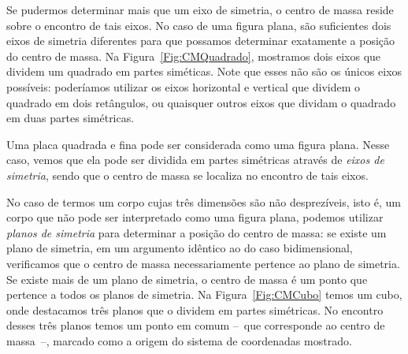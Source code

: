 Se pudermos determinar mais que um eixo de simetria, o centro de massa reside sobre o encontro de tais eixos. No caso de uma figura plana, são suficientes dois eixos de simetria diferentes para que possamos determinar exatamente a posição do centro de massa. Na Figura~\ref{Fig:CMQuadrado}, mostramos dois eixos que dividem um quadrado em partes siméticas. Note que esses não são os únicos eixos possíveis: poderíamos utilizar os eixos horizontal e vertical que dividem o quadrado em dois retângulos, ou quaisquer outros eixos que dividam o quadrado em duas partes simétricas.
\begin{marginfigure}
\centering
{}
\caption{Uma placa quadrada e fina pode ser considerada como uma figura plana. Nesse caso, vemos que ela pode ser dividida em partes simétricas através de \emph{eixos de simetria}, sendo que o centro de massa se localiza no encontro de tais eixos. \label{Fig:CMQuadrado}}
\end{marginfigure}


No caso de termos um corpo cujas três dimensões são não desprezíveis, isto é, um corpo que não pode ser interpretado como uma figura plana, podemos utilizar \emph{planos de simetria} para determinar a posição do centro de massa: se existe um plano de simetria, em um argumento idêntico ao do caso bidimensional, verificamos que o centro de massa necessariamente pertence ao plano de simetria. Se existe mais de um plano de simetria, o centro de massa é um ponto que pertence a todos os planos de simetria. Na Figura~\ref{Fig:CMCubo} temos um cubo, onde destacamos três planos que o dividem em partes simétricas. No encontro desses três planos temos um ponto em comum --~que corresponde ao centro de massa~--, marcado como a origem do sistema de coordenadas mostrado. 

